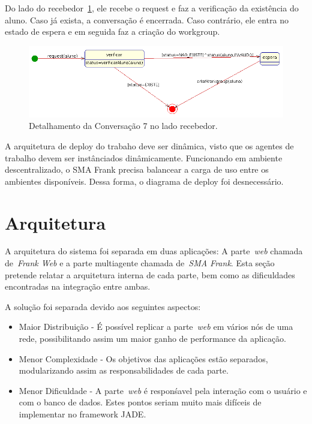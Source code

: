 Do lado do recebedor~\ref{fig:conv7-recebedor}, ele recebe o request e faz a verificação da existência do aluno. Caso já exista, a conversação é encerrada. Caso contrário, ele entra no estado de espera e em seguida faz a criação do workgroup.
\begin{figure}
	\centering
	\includegraphics[scale=0.48]{images/conv7-recebedor.png}
	\caption{Detalhamento da Conversação 7 no lado recebedor.}
	\label{fig:conv7-recebedor}
\end{figure}

A arquitetura de deploy do trabaho deve ser dinâmica, visto que os agentes de trabalho devem ser instânciados dinâmicamente. Funcionando em ambiente descentralizado, o SMA Frank precisa balancear a carga de uso entre os ambientes disponíveis. Dessa forma, o diagrama de deploy foi desnecessário.

\section{Arquitetura}\label{section:arquitetura}

A arquitetura do sistema foi separada em duas aplicações: A parte~\emph{web} chamada de~\emph{Frank Web} e a parte multiagente chamada de~\emph{SMA Frank}. Esta seção pretende relatar a arquitetura interna de cada parte, bem como as dificuldades encontradas na integração entre ambas.

A solução foi separada devido aos seguintes aspectos:
\begin{itemize}
	\item Maior Distribuição - É possível replicar a parte~\emph{web} em vários nós de uma rede, possibilitando assim um maior ganho de performance da aplicação.
	\item Menor Complexidade - Os objetivos das aplicações estão separados, modularizando assim as responsabilidades de cada parte.
	\item Menor Dificuldade - A parte~\emph{web} é responśavel pela interação com o usuário e com o banco de dados. Estes pontos seriam muito mais difíceis de implementar no framework JADE.
\end{itemize}

